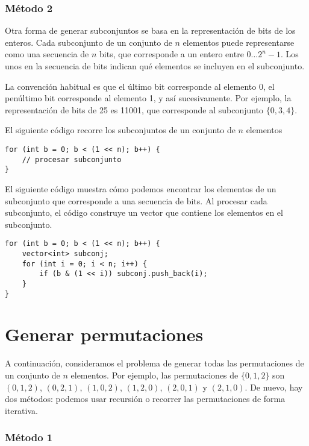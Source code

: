 \subsubsection{Método 2}

Otra forma de generar subconjuntos se basa en
la representación de bits de los enteros.
Cada subconjunto de un conjunto de $n$ elementos
puede representarse como una secuencia de $n$ bits,
que corresponde a un entero entre $0 \ldots 2^n-1$.
Los unos en la secuencia de bits indican
qué elementos se incluyen en el subconjunto.

La convención habitual es que
el último bit corresponde al elemento 0,
el penúltimo bit corresponde al elemento 1,
y así sucesivamente.
Por ejemplo, la representación de bits de 25
es 11001, que corresponde al subconjunto $\{0,3,4\}$.

El siguiente código recorre los subconjuntos
de un conjunto de $n$ elementos

\begin{lstlisting}
for (int b = 0; b < (1 << n); b++) {
    // procesar subconjunto
}
\end{lstlisting}

El siguiente código muestra cómo podemos encontrar
los elementos de un subconjunto que corresponde a una secuencia de bits.
Al procesar cada subconjunto,
el código construye un vector que contiene los
elementos en el subconjunto.

\begin{lstlisting}
for (int b = 0; b < (1 << n); b++) {
    vector<int> subconj;
    for (int i = 0; i < n; i++) {
        if (b & (1 << i)) subconj.push_back(i);
    }
}
\end{lstlisting}

\section{Generar permutaciones}


A continuación, consideramos el problema de generar
todas las permutaciones de un conjunto de $n$ elementos.
Por ejemplo, las permutaciones de $\{0,1,2\}$ son
$(0,1,2)$, $(0,2,1)$, $(1,0,2)$, $(1,2,0)$,
$(2,0,1)$ y $(2,1,0)$.
De nuevo, hay dos métodos:
podemos usar recursión o recorrer las
permutaciones de forma iterativa.

\subsubsection{Método 1}

